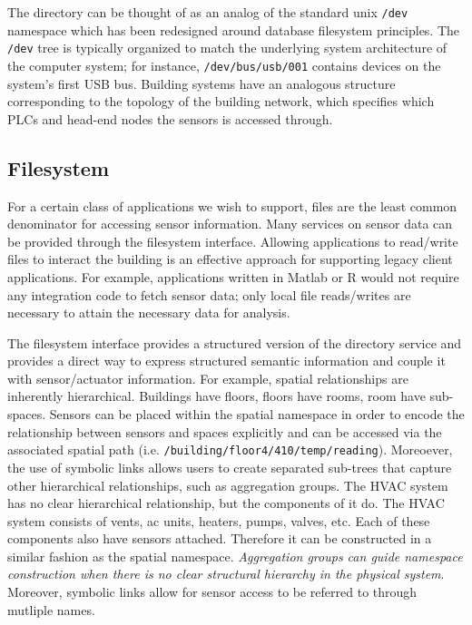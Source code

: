 The directory can be thought of as an analog of the standard unix {\tt /dev} namespace which has been redesigned around database filesystem principles.  The {\tt /dev} tree is typically organized to match the underlying system architecture of the computer system; for instance, {\tt /dev/bus/usb/001} contains devices on the system's first USB bus.  Building systems have an analogous structure corresponding to the topology of the building network, which specifies which PLCs and head-end nodes the sensors is accessed through.  

\subsection{Filesystem}
For a certain class of applications we wish to support, files are the least common denominator for accessing sensor information.  Many services on sensor data can be provided through the filesystem interface.  Allowing applications to read/write files to interact the building is an effective approach for supporting legacy client applications.  For example, applications written in Matlab or R would not require any integration code to fetch sensor data; only local file reads/writes are necessary to attain the necessary data for analysis.

The filesystem interface provides a structured version of the directory service and provides a direct way to express structured semantic information and couple it with sensor/actuator information.  For example, spatial relationships are inherently hierarchical.  Buildings have floors, floors have rooms, room have sub-spaces.  Sensors can be placed within the spatial namespace in order to encode the relationship between sensors and spaces explicitly and can be accessed via the associated spatial path (i.e. {\tt /building/floor4/410/temp/reading}).  Moreoever, the use of symbolic links allows users to create separated sub-trees that capture other hierarchical relationships, such as aggregation groups.  The HVAC system has no clear hierarchical relationship, but the components of it do.  The HVAC system consists of vents, ac units, heaters, pumps, valves, etc.  Each of these components also have sensors attached.  Therefore it can be constructed in a similar fashion as the spatial namespace.  \emph{Aggregation groups can guide namespace construction when there is no clear structural hierarchy in the physical system}.  Moreover, symbolic links allow for sensor access to be referred to through mutliple names.

